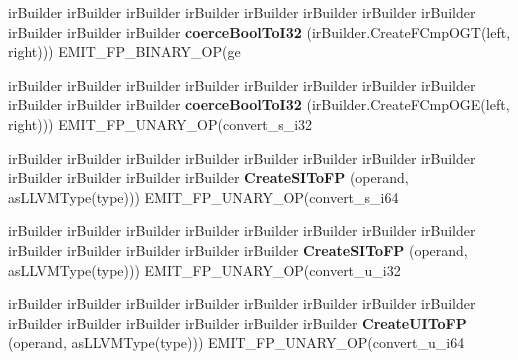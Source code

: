 \begin{DoxyCompactItemize}
\item 
\mbox{\label{struct_l_l_v_m_j_i_t_1_1_emit_function_context_a6fd4ccdb8719c8f220f43e5248170b0e}} 
ir\+Builder ir\+Builder ir\+Builder ir\+Builder ir\+Builder ir\+Builder ir\+Builder ir\+Builder ir\+Builder ir\+Builder ir\+Builder {\bfseries coerce\+Bool\+To\+I32} (ir\+Builder.\+Create\+F\+Cmp\+O\+GT(left, right))) E\+M\+I\+T\+\_\+\+F\+P\+\_\+\+B\+I\+N\+A\+R\+Y\+\_\+\+OP(ge
\item 
\mbox{\label{struct_l_l_v_m_j_i_t_1_1_emit_function_context_a4dcf4745b0b88701be931f751b357c5f}} 
ir\+Builder ir\+Builder ir\+Builder ir\+Builder ir\+Builder ir\+Builder ir\+Builder ir\+Builder ir\+Builder ir\+Builder ir\+Builder {\bfseries coerce\+Bool\+To\+I32} (ir\+Builder.\+Create\+F\+Cmp\+O\+GE(left, right))) E\+M\+I\+T\+\_\+\+F\+P\+\_\+\+U\+N\+A\+R\+Y\+\_\+\+OP(convert\+\_\+s\+\_\+i32
\item 
\mbox{\label{struct_l_l_v_m_j_i_t_1_1_emit_function_context_a127d8a2b0efeaf6662211b84bb4e9222}} 
ir\+Builder ir\+Builder ir\+Builder ir\+Builder ir\+Builder ir\+Builder ir\+Builder ir\+Builder ir\+Builder ir\+Builder ir\+Builder ir\+Builder {\bfseries Create\+S\+I\+To\+FP} (operand, as\+L\+L\+V\+M\+Type(type))) E\+M\+I\+T\+\_\+\+F\+P\+\_\+\+U\+N\+A\+R\+Y\+\_\+\+OP(convert\+\_\+s\+\_\+i64
\item 
\mbox{\label{struct_l_l_v_m_j_i_t_1_1_emit_function_context_aad2811a39172360b6fc94cc7445d06dc}} 
ir\+Builder ir\+Builder ir\+Builder ir\+Builder ir\+Builder ir\+Builder ir\+Builder ir\+Builder ir\+Builder ir\+Builder ir\+Builder ir\+Builder ir\+Builder {\bfseries Create\+S\+I\+To\+FP} (operand, as\+L\+L\+V\+M\+Type(type))) E\+M\+I\+T\+\_\+\+F\+P\+\_\+\+U\+N\+A\+R\+Y\+\_\+\+OP(convert\+\_\+u\+\_\+i32
\item 
\mbox{\label{struct_l_l_v_m_j_i_t_1_1_emit_function_context_a1156e7991439d276f3754b25de5d1375}} 
ir\+Builder ir\+Builder ir\+Builder ir\+Builder ir\+Builder ir\+Builder ir\+Builder ir\+Builder ir\+Builder ir\+Builder ir\+Builder ir\+Builder ir\+Builder ir\+Builder {\bfseries Create\+U\+I\+To\+FP} (operand, as\+L\+L\+V\+M\+Type(type))) E\+M\+I\+T\+\_\+\+F\+P\+\_\+\+U\+N\+A\+R\+Y\+\_\+\+OP(convert\+\_\+u\+\_\+i64

\end{DoxyCompactItemize}
